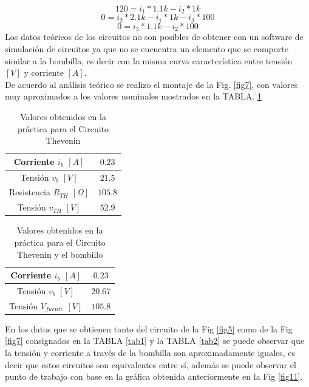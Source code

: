 \documentclass[twocolumn]{IEEEtran}
\begin{document}
\begin{equation}
 120 = i_1*1.1 k - i_2 * 1 k
\end{equation}
\begin{equation}
 0 = i_2 * 2.1 k - i_1 * 1 k - i_3 * 100
\end{equation}
\begin{equation}
 0 = i_3 * 1.1 k - i_2 * 100
\end{equation}
\noindent
Los datos teóricos de los circuitos no son posibles de obtener con un software de simulación de circuitos ya que no se encuentra un elemento que se comporte similar a la bombilla, es decir con la misma curva característica entre tensión $[V]$ y corriente $[A]$.\\
\noindent
De acuerdo al análisis teórico se realizo el montaje de la Fig. \ref{fig7}, con valores muy aproximados a los valores nominales mostrados en la TABLA. \ref{tab3}
\begin{table}[H]
	\centering
\begin{tabular}[c]{|c||c|} \hline
Corriente $i_b$ $[A]$ & $0.23$ \\ \hline
Tensión $v_b$ $[V]$ & $21.5$ \\ \hline
Resistencia $R_{TH}$ $[\Omega]$ & $105.8$ \\ \hline
Tensión $v_{TH}$ $[V]$ & $52.9$ \\ \hline
\end{tabular}
	\caption{Valores obtenidos en la práctica para el Circuito Thevenin}
	\label{tab3}
\end{table}
\noindent
\begin{table}[H]
	\centering
\begin{tabular}[c]{|c||c|} \hline
Corriente $i_b$ $[A]$ & $0.23$ \\ \hline
Tensión $v_b$ $[V]$ & $20.67$ \\ \hline
Tensión $V_{fuente}$ $[V]$ & $105.8$ \\ \hline
\end{tabular}
	\caption{Valores obtenidos en la práctica para el Circuito Thevenin y el bombillo}
	\label{tab4}
\end{table}
\noindent
En los datos que se obtienen tanto del  circuito  de la Fig \ref{fig5} como de la Fig \ref{fig7} consignados en la TABLA \ref{tab1} y la TABLA \ref{tab2} se puede observar  que la tensión y corriente a través de la bombilla son aproximadamente iguales, es decir que estos circuitos son equivalentes entre sí, además se puede observar el punto de trabajo con base en la gráfica obtenida anteriormente en la Fig \ref{fig11}.
\end{document}
